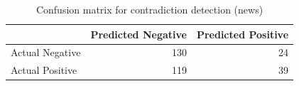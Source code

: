 \begin{table}
\caption{Confusion matrix for contradiction detection (news)}
\label{tab:confusion_matrix}
\begin{tabular}{lrr}
\toprule
 & Predicted Negative & Predicted Positive \\
\midrule
Actual Negative & 130 & 24 \\
Actual Positive & 119 & 39 \\
\bottomrule
\end{tabular}
\end{table}
